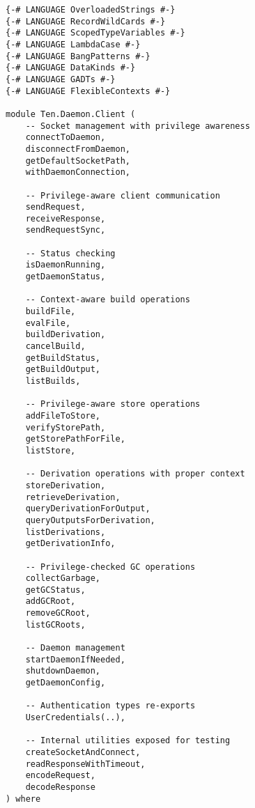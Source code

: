 \documentclass{article}
\begin{document}
\begin{tcolorbox}[title=Ten/Daemon/Client.hs Changes]
\begin{verbatim}
{-# LANGUAGE OverloadedStrings #-}
{-# LANGUAGE RecordWildCards #-}
{-# LANGUAGE ScopedTypeVariables #-}
{-# LANGUAGE LambdaCase #-}
{-# LANGUAGE BangPatterns #-}
{-# LANGUAGE DataKinds #-}
{-# LANGUAGE GADTs #-}
{-# LANGUAGE FlexibleContexts #-}

module Ten.Daemon.Client (
    -- Socket management with privilege awareness
    connectToDaemon,
    disconnectFromDaemon,
    getDefaultSocketPath,
    withDaemonConnection,

    -- Privilege-aware client communication
    sendRequest,
    receiveResponse,
    sendRequestSync,

    -- Status checking
    isDaemonRunning,
    getDaemonStatus,

    -- Context-aware build operations
    buildFile,
    evalFile,
    buildDerivation,
    cancelBuild,
    getBuildStatus,
    getBuildOutput,
    listBuilds,

    -- Privilege-aware store operations
    addFileToStore,
    verifyStorePath,
    getStorePathForFile,
    listStore,

    -- Derivation operations with proper context
    storeDerivation,
    retrieveDerivation,
    queryDerivationForOutput,
    queryOutputsForDerivation,
    listDerivations,
    getDerivationInfo,

    -- Privilege-checked GC operations
    collectGarbage,
    getGCStatus,
    addGCRoot,
    removeGCRoot,
    listGCRoots,

    -- Daemon management
    startDaemonIfNeeded,
    shutdownDaemon,
    getDaemonConfig,

    -- Authentication types re-exports
    UserCredentials(..),

    -- Internal utilities exposed for testing
    createSocketAndConnect,
    readResponseWithTimeout,
    encodeRequest,
    decodeResponse
) where


\end{verbatim}
\end{tcolorbox}
\end{document}
